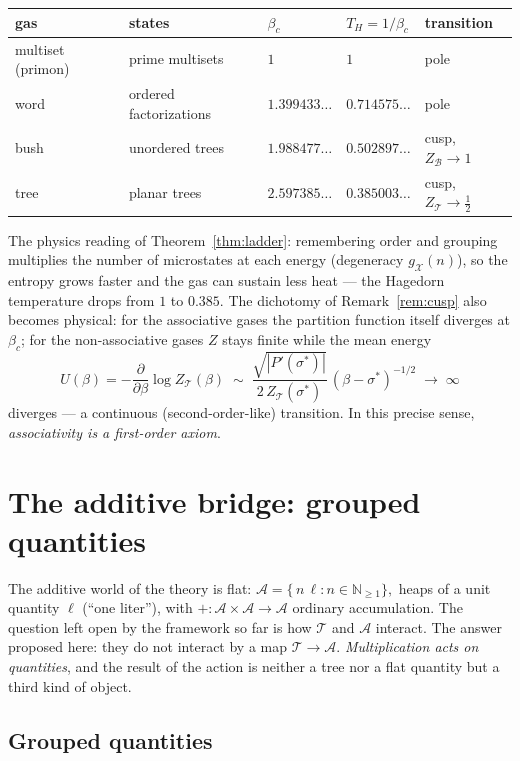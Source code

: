 \documentclass[11pt]{article}
\newcommand{\cT}{\mathcal{T}}   %
\newcommand{\cB}{\mathcal{B}}   %
\newcommand{\cA}{\mathcal{A}}   %
\newcommand{\NN}{\mathbb{N}}
\numberwithin{equation}{section}
\theoremstyle{plain}
\theoremstyle{definition}
\theoremstyle{remark}
\begin{document}
\begin{center}
\begin{tabular}{@{}lllll@{}}
\toprule
gas & states & $\beta_c$ & $T_H = 1/\beta_c$ & transition \\
\midrule
multiset (primon) & prime multisets & $1$ & $1$ & pole \\
word & ordered factorizations & $1.399433\dots$ & $0.714575\dots$ & pole \\
bush & unordered trees & $1.988477\dots$ & $0.502897\dots$ & cusp, $Z_\cB \to 1$ \\
tree & planar trees & $2.597385\dots$ & $0.385003\dots$ & cusp, $Z_\cT \to \tfrac12$ \\
\bottomrule
\end{tabular}
\end{center}

The physics reading of Theorem~\ref{thm:ladder}: remembering order and grouping
multiplies the number of microstates at each energy (degeneracy
$g_{\mathcal X}(n)$), so the entropy grows faster and the gas can sustain less heat ---
the Hagedorn temperature drops from $1$ to $0.385$. The dichotomy of
Remark~\ref{rem:cusp} also becomes physical: for the associative gases the partition
function itself diverges at $\beta_c$; for the non-associative gases $Z$ stays finite
while the mean energy
\[
U(\beta) = -\frac{\partial}{\partial \beta} \log Z_\cT(\beta)
\;\sim\; \frac{\sqrt{|P'(\sigma^{*})|}}{2\,Z_\cT(\sigma^{*})}\,(\beta - \sigma^{*})^{-1/2}
\;\to\; \infty
\]
diverges --- a continuous (second-order-like) transition. In this precise sense,
\emph{associativity is a first-order axiom}.

\section{The additive bridge: grouped quantities}\label{sec:bridge}

The additive world of the theory is flat: $\cA = \{\,n\,\ell : n \in \NN_{\ge1}\},$
heaps of a unit quantity $\ell$ (``one liter''), with
$+\colon \cA \times \cA \to \cA$ ordinary accumulation. The question left open by the
framework so far is how $\cT$ and $\cA$ interact. The answer proposed here: they do not
interact by a map $\cT \to \cA$. \emph{Multiplication acts on quantities}, and the
result of the action is neither a tree nor a flat quantity but a third kind of object.

\subsection{Grouped quantities}
\end{document}
